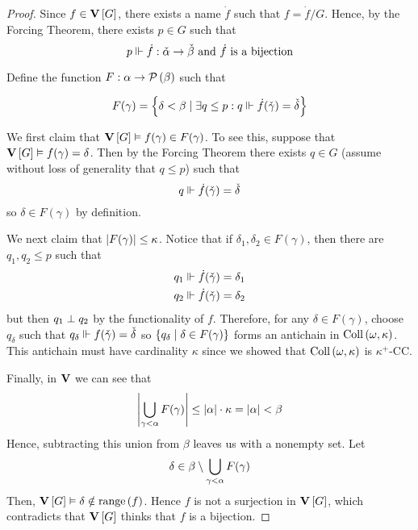 \documentclass[11pt]{article}
\DeclareMathOperator{\collOp}{Coll}
\newcommand{\coll}[1]{\collOp{\parens{#1}}}
\begin{document}
\begin{proof}
    Since $f \in \m$, there exists a name $\dot f$ such that $f = \dot f / G$.
    Hence, by the Forcing Theorem, there exists $p \in G$ such that
    \begin{equation*}
        p \Vdash
        \dot f : \check \alpha \to \check \beta
        \text{ and $\dot f$ is a bijection}
    \end{equation*}

    Define the function $F : \alpha \to \operatorname{\mathcal{P}}{\left(\beta\right)}$ such that

    \begin{equation*}
        F(\gamma) = \left\{
            \delta < \beta
            \;\vert\;
            \exists q \leq p : q \Vdash \dot f(\check \gamma) = \check \delta
        \right\}
    \end{equation*}

    We first claim that $\m \models f(\gamma) \in F(\gamma)$.
    To see this, suppose that $\m \models f(\gamma) = \delta$.
    Then by the Forcing Theorem there exists $q \in G$ (assume without loss of
    generality that $q \leq p$) such that
    \begin{equation*}
        q \Vdash \dot f(\check \gamma) = \check \delta
    \end{equation*}
    so $\delta \in F(\gamma)$ by definition.

    We next claim that $\left\lvert F(\gamma)\right\rvert \leq \kappa$.
    Notice that if $\delta_1, \delta_2 \in F(\gamma)$, then there are
    $q_1, q_2 \leq p$ such that
    \begin{align*}
        q_1 &\Vdash \dot f(\check \gamma) = \delta_1 \\
        q_2 &\Vdash \dot f(\check \gamma) = \delta_2
    \end{align*}
    but then $q_1 \perp q_2$ by the functionality of $f$.
    Therefore, for any $\delta \in F(\gamma)$,
    choose $q_\delta$
    such that $q_\delta \Vdash f(\check \gamma) = \check \delta$
    so $\left\{q_\delta \;\vert\; \delta \in F(\gamma)\right\}$ forms an antichain in
    $\coll{\omega, \kappa}$.
    This antichain must have cardinality $\kappa$ since we showed that
    $\coll{\omega,\kappa}$ is $\kappa^+$-CC.

    Finally, in $\verum$ we can see that
    \begin{equation*}
        \left\lvert\bigcup_{\gamma < \alpha} F(\gamma)\right\rvert
        \leq \left\lvert\alpha\right\rvert \cdot \kappa
        = \left\lvert\alpha\right\rvert < \beta
    \end{equation*}
    Hence, subtracting this union from $\beta$ leaves us with a nonempty set.
    Let
    \begin{equation*}
        \delta \in \beta \setminus \bigcup_{\gamma < \alpha} F(\gamma)
    \end{equation*}
    Then, $\m \models \delta \notin \rng{f}$.
    Hence $f$ is not a surjection in $\m$, which contradicts that $\m$ thinks
    that $f$ is a bijection.
\end{proof}
\end{document}
